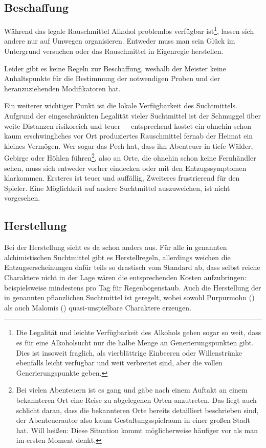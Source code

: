 \subsection{Beschaffung}
Während das legale Rauschmittel Alkohol problemlos verfügbar ist\footnote{Die Legalität und leichte Verfügbarkeit des Alkohols gehen sogar so weit, dass es für eine Alkoholsucht nur die halbe Menge an Generierungspunkten gibt. Dies ist insoweit fraglich, als vierblättrige Einbeeren oder Willenstrünke ebenfalls leicht verfügbar und weit verbreitet sind, aber die vollen Generierungspunkte geben.}, lassen sich andere nur auf Umwegen organisieren. Entweder muss man sein Glück im Untergrund versuchen oder das Rauschmittel in Eigenregie herstellen.

Leider gibt es keine Regeln zur Beschaffung, weshalb der Meister keine Anhaltspunkte für die Bestimmung der notwendigen Proben und der heranzuziehenden Modifikatoren hat.

Ein weiterer wichtiger Punkt ist die lokale Verfügbarkeit des Suchtmittels. Aufgrund der eingeschränkten Legalität vieler Suchtmittel ist der Schmuggel über weite Distanzen risikoreich und teuer~--~entsprechend kostet ein ohnehin schon kaum erschwingliches vor Ort produziertes Rauschmittel fernab der Heimat ein kleines Vermögen. Wer sogar das Pech hat, dass ihn Abenteuer in tiefe Wälder, Gebirge oder Höhlen führen\footnote{Bei vielen Abenteuern ist es gang und gäbe nach einem Auftakt an einem bekannteren Ort eine Reise zu abgelegenen Orten anzutreten. Das liegt auch schlicht daran, dass die bekannteren Orte bereits detailliert beschrieben sind, der Abenteuerautor also kaum Gestaltungsspielraum in einer großen Stadt hat. Will heißen: Diese Situation kommt möglicherweise häufiger vor als man im ersten Moment denkt.}, also an Orte, die ohnehin schon keine Fernhändler sehen, muss sich entweder vorher eindecken oder mit den Entzugssymptomen klarkommen. Ersteres ist teuer und auffällig, Zweiteres frustrierend für den Spieler. Eine Möglichkeit auf andere Suchtmittel auszuweichen, ist nicht vorgesehen.

\subsection{Herstellung}
Bei der Herstellung sieht es da schon anders aus. Für alle in  genannten alchimistischen Suchtmittel gibt es Herstellregeln, allerdings weichen die Entzugserscheinungen dafür teils so drastisch vom Standard ab, dass selbst reiche Charaktere nicht in der Lage wären die entsprechenden Kosten aufzubringen: beispielsweise mindestens  pro Tag für Regenbogenstaub. Auch die Herstellung der in  genannten pflanzlichen Suchtmittel ist geregelt, wobei sowohl Purpurmohn () als auch Malomis () quasi-unspielbare Charaktere erzeugen.

